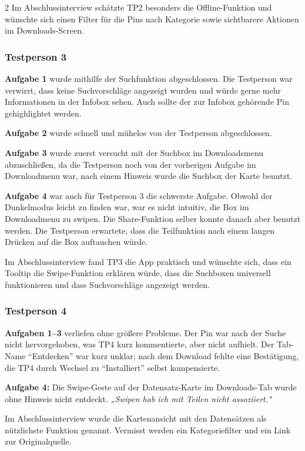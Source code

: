 \begin{multicols}{2}
Im Abschlussinterview schätzte TP2 besonders die Offline-Funktion
und wünschte sich einen Filter für die Pins nach Kategorie sowie
sichtbarere Aktionen im Downloads-Screen.

\subsubsection*{Testperson 3}

\textbf{Aufgabe 1} wurde mithilfe der Suchfunktion abgeschlossen. Die Testperson war verwirrt, dass keine Suchvorschläge angezeigt wurden und würde gerne mehr Informationen in der Infobox sehen. Auch sollte der zur Infobox gehörende Pin gehighlightet werden.

\textbf{Aufgabe 2} wurde schnell und mühelos von der Testperson abgeschlossen.

\textbf{Aufgabe 3} wurde zuerst versucht mit der Suchbox im Downloadsmenu abzuschließen, da die Testperson noch von der vorherigen Aufgabe im Downloadmenu war, nach einem Hinweis wurde die Suchbox der Karte benutzt. 

\textbf{Aufgabe 4} war auch für Testperson 3 die schwerste Aufgabe. Obwohl der Dunkelmodus leicht zu finden war, war es nicht intuitiv, die Box im Downloadmenu zu swipen. Die Share-Funktion selber konnte danach aber benutzt werden.
Die Testperson erwartete, dass die Teilfunktion nach einem langen Drücken auf die Box auftauchen würde.

Im Abschlussinterview fand TP3 die App praktisch und wünschte sich, dass ein Tooltip die Swipe-Funktion erklären würde, dass die Suchboxen universell funktionieren und dass Suchvorschläge angezeigt werden.

\subsubsection*{Testperson 4}

\textbf{Aufgaben 1--3} verliefen ohne größere Probleme.
Der Pin war nach der Suche nicht hervorgehoben, was TP4 kurz kommentierte,
aber nicht aufhielt.
Der Tab-Name \enquote{Entdecken} war kurz unklar;
nach dem Download fehlte eine Bestätigung, die TP4 durch Wechsel zu
\enquote{Installiert} selbst kompensierte.

\textbf{Aufgabe 4:} Die Swipe-Geste auf der Datensatz-Karte im
Downloads-Tab wurde ohne Hinweis nicht entdeckt.
\textit{„Swipen hab ich mit Teilen nicht assoziiert."}

Im Abschlussinterview wurde die Kartenansicht mit den Datensätzen als
nützlichste Funktion genannt. Vermisst werden ein Kategoriefilter und
ein Link zur Originalquelle.


\end{multicols}
